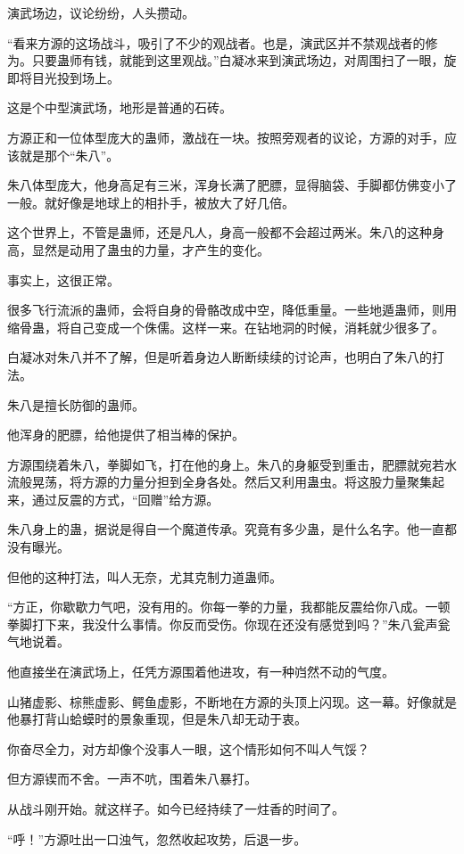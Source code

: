 \begin{this_body}
演武场边，议论纷纷，人头攒动。

“看来方源的这场战斗，吸引了不少的观战者。也是，演武区并不禁观战者的修为。只要蛊师有钱，就能到这里观战。”白凝冰来到演武场边，对周围扫了一眼，旋即将目光投到场上。

这是个中型演武场，地形是普通的石砖。

方源正和一位体型庞大的蛊师，激战在一块。按照旁观者的议论，方源的对手，应该就是那个“朱八”。

朱八体型庞大，他身高足有三米，浑身长满了肥膘，显得脑袋、手脚都仿佛变小了一般。就好像是地球上的相扑手，被放大了好几倍。

这个世界上，不管是蛊师，还是凡人，身高一般都不会超过两米。朱八的这种身高，显然是动用了蛊虫的力量，才产生的变化。

事实上，这很正常。

很多飞行流派的蛊师，会将自身的骨骼改成中空，降低重量。一些地遁蛊师，则用缩骨蛊，将自己变成一个侏儒。这样一来。在钻地洞的时候，消耗就少很多了。

白凝冰对朱八并不了解，但是听着身边人断断续续的讨论声，也明白了朱八的打法。

朱八是擅长防御的蛊师。

他浑身的肥膘，给他提供了相当棒的保护。

方源围绕着朱八，拳脚如飞，打在他的身上。朱八的身躯受到重击，肥膘就宛若水流般晃荡，将方源的力量分担到全身各处。然后又利用蛊虫。将这股力量聚集起来，通过反震的方式，“回赠”给方源。

朱八身上的蛊，据说是得自一个魔道传承。究竟有多少蛊，是什么名字。他一直都没有曝光。

但他的这种打法，叫人无奈，尤其克制力道蛊师。

“方正，你歇歇力气吧，没有用的。你每一拳的力量，我都能反震给你八成。一顿拳脚打下来，我没什么事情。你反而受伤。你现在还没有感觉到吗？”朱八瓮声瓮气地说着。

他直接坐在演武场上，任凭方源围着他进攻，有一种岿然不动的气度。

山猪虚影、棕熊虚影、鳄鱼虚影，不断地在方源的头顶上闪现。这一幕。好像就是他暴打背山蛤蟆时的景象重现，但是朱八却无动于衷。

你奋尽全力，对方却像个没事人一眼，这个情形如何不叫人气馁？

但方源锲而不舍。一声不吭，围着朱八暴打。

从战斗刚开始。就这样子。如今已经持续了一炷香的时间了。

“呼！”方源吐出一口浊气，忽然收起攻势，后退一步。


\end{this_body}
